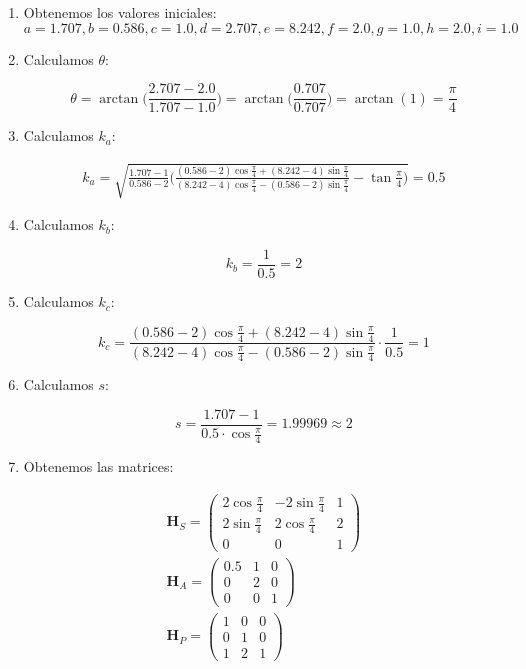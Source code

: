 \documentclass[11pt,a4paper]{article}
\begin{document}
\begin{enumerate}
	\item Obtenemos los valores iniciales:
	$$
	a = 1.707, b=0.586, c = 1.0, d=2.707, e = 8.242, f = 2.0, g=1.0, h=2.0, i=1.0
	$$
	\item Calculamos $\theta$:
	
	$$
	\theta = \arctan\Big( \frac{2.707-2.0}{1.707-1.0} \Big) =
	\arctan\Big( \frac{0.707}{0.707} \Big) = \arctan(1) = \frac{\pi}{4}
	$$
	
	\item Calculamos $k_a$:
	
	\begin{gather*}
	k_a = \sqrt{\frac{1.707-1}{0.586-2}\Bigg(\frac{(0.586-2)\cos\frac{\pi}{4} + (8.242-4)\sin\frac{\pi}{4}}{(8.242-4)\cos\frac{\pi}{4} - (0.586-2)\sin\frac{\pi}{4}} - \tan\frac{\pi}{4}\Bigg)} = 0.5
	\end{gather*}
	
	\item Calculamos $k_b$:
	
	$$
	k_b = \frac{1}{0.5} = 2 
	$$
	
	\item Calculamos $k_c$:
	
	$$
	k_c = \frac{(0.586-2)\cos\frac{\pi}{4} + (8.242-4)\sin\frac{\pi}{4}}{(8.242-4)\cos\frac{\pi}{4} - (0.586-2)\sin\frac{\pi}{4}}  \cdot \frac{1}{0.5} = 1
	$$
	
	\item Calculamos $s$:
	
	$$
	s = \frac{1.707 - 1}{0.5\cdot \cos\frac{\pi}{4}} = 1.99969 \approx 2
	$$
	
	\item Obtenemos las matrices:
	
	\begin{gather*}
	\mathbf{H}_S =
	\begin{pmatrix}
	2\cos\frac{\pi}{4} & -2\sin\frac{\pi}{4} & 1\\
	2\sin\frac{\pi}{4} & 2\cos\frac{\pi}{4} & 2\\
	0 & 0 & 1
	\end{pmatrix}\\
	\mathbf{H}_A =
	\begin{pmatrix}
	0.5 & 1 & 0 \\ 0 & 2 & 0 \\ 0 & 0 & 1
	\end{pmatrix}\\
	\mathbf{H}_P =
	\begin{pmatrix}
	1 & 0 & 0 \\ 0 & 1 & 0 \\ 1 & 2 & 1
	\end{pmatrix}
 	\end{gather*}
\end{enumerate}
\end{document}
